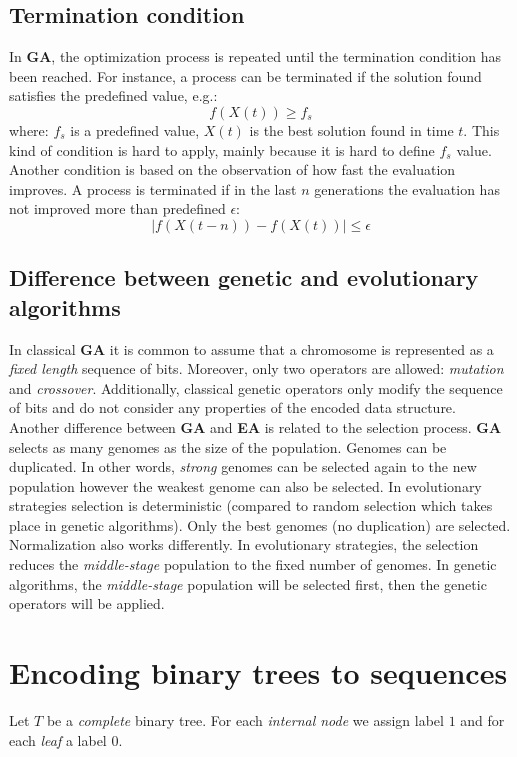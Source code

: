 \documentclass[12pt]{article}
\begin{document}
\subsection{Termination condition}
In \textbf{GA}, the optimization process is repeated until the termination condition has been reached. For instance, a process can be terminated if the solution found satisfies the predefined value, e.g.:
\[
    f({X}(t)) \geq f_s
\]
where:
 $f_s$ is a predefined value,
 ${X}(t)$ is the best solution found in time $t$. This kind of condition is hard to apply, mainly because it is hard to define $f_s$ value.
\\
Another condition is based on the observation of how fast the evaluation improves. A process is terminated if in the last $n$ generations the evaluation has not improved more than predefined  $\epsilon$:
\[
     |f({X}(t - n)) - f({X}(t))| \leq \epsilon
\]

\subsection{Difference between genetic and evolutionary algorithms}
In classical \textbf{GA} it is common to assume that a chromosome is represented as a \textit{fixed length} sequence of bits. Moreover, only two operators are allowed: \textit{mutation} and \textit{crossover}. Additionally, classical genetic operators only modify the sequence of bits and do not consider any properties of the encoded data structure.\\
Another difference between \textbf{GA} and \textbf{EA} is related to the selection process.
\textbf{GA} selects as many genomes as the size of the population. Genomes can be duplicated. In other words, \textit{strong} genomes can be selected again to the new population however the weakest genome can also be selected.
In evolutionary strategies selection is deterministic (compared to random selection which takes place in genetic algorithms). Only the best genomes (no duplication) are selected.\\
Normalization also works differently. In evolutionary strategies, the selection reduces the \textit{middle-stage} population to the fixed number of genomes. In genetic algorithms, the \textit{middle-stage} population will be selected first, then the genetic operators will be applied.

\section{Encoding binary trees to sequences}
Let $T$ be a \textit{complete} binary tree. For each \textit{internal node} we assign label $1$ and for each \textit{leaf} a label $0$.
\end{document}
